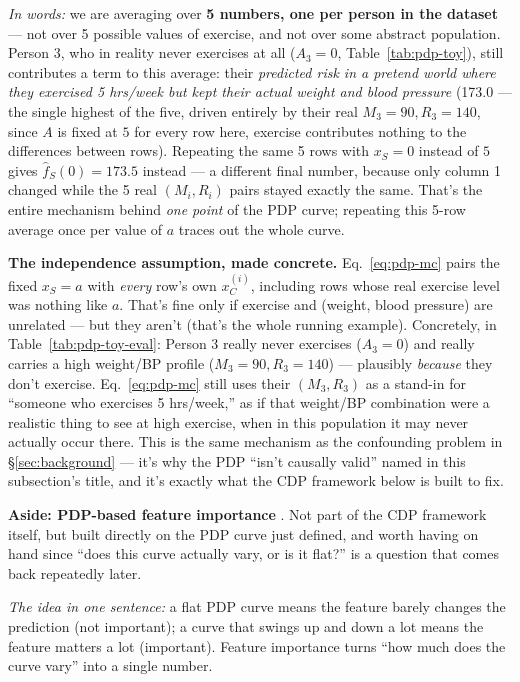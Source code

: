 \noindent\textit{In words:} we are averaging over \textbf{5 numbers, one
per person in the dataset} --- not over 5 possible values of exercise, and
not over some abstract population. Person 3, who in reality never
exercises at all ($A_3=0$, Table~\ref{tab:pdp-toy}), still contributes a
term to this average: their \emph{predicted risk in a pretend world where
they exercised 5 hrs/week but kept their actual weight and blood
pressure} (173.0 --- the single highest of the five, driven entirely by
their real $M_3=90,R_3=140$, since $A$ is fixed at $5$ for every row
here, exercise contributes nothing to the differences between rows).
Repeating the same 5 rows with $x_S=0$ instead of $5$ gives
$\hat f_S(0)=173.5$ instead --- a different final number, because only
column 1 changed while the 5 real $(M_i,R_i)$ pairs stayed exactly the
same. That's the entire mechanism behind \emph{one point} of the PDP
curve; repeating this 5-row average once per value of $a$ traces out the
whole curve.

\textbf{The independence assumption, made concrete.} Eq.~\eqref{eq:pdp-mc}
pairs the fixed $x_S=a$ with \emph{every} row's own $x_C^{(i)}$, including
rows whose real exercise level was nothing like $a$. That's fine only if
exercise and (weight, blood pressure) are unrelated --- but they aren't
(that's the whole running example). Concretely, in
Table~\ref{tab:pdp-toy-eval}: Person 3 really never exercises
($A_3=0$) and really carries a high weight/BP profile ($M_3=90,R_3=140$)
--- plausibly \emph{because} they don't exercise. Eq.~\eqref{eq:pdp-mc}
still uses their $(M_3,R_3)$ as a stand-in for ``someone who exercises 5
hrs/week,'' as if that weight/BP combination were a realistic thing to see
at high exercise, when in this population it may never actually occur
there.
This is the same mechanism as the confounding problem in
\S\ref{sec:background} --- it's why the PDP ``isn't causally valid'' named
in this subsection's title, and it's exactly what the CDP framework below
is built to fix.

\bigskip
\noindent\textbf{Aside: PDP-based feature importance}
. Not part of the CDP
framework itself, but built directly on the PDP curve just defined, and
worth having on hand since ``does this curve actually vary, or is it
flat?'' is a question that comes back repeatedly later.

\emph{The idea in one sentence:} a flat PDP curve means the feature barely
changes the prediction (not important); a curve that swings up and down a
lot means the feature matters a lot (important). Feature importance turns
``how much does the curve vary'' into a single number.

